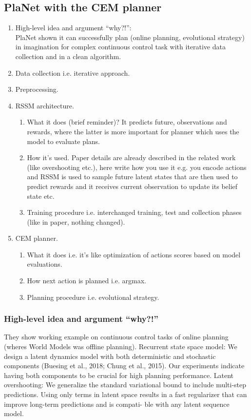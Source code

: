 \subsection{PlaNet with the CEM planner}

\begin{enumerate}
\item High-level idea and argument ``why?!'':\\
  PlaNet shown it can successfully plan (online planning, evolutional strategy) in imagination for complex continuous control task with iterative data collection and in a clean algorithm.
\item Data collection i.e. iterative approach.
\item Preprocessing.
\item RSSM architecture.\\ 
  \begin{enumerate}
  \item What it does (brief reminder)? It predicts future, observations and rewards, where the latter is more important for planner which uses the model to evaluate plans. 
  \item How it's used. Paper details are already described in the related work (like overshooting etc.), here write how you use it e.g. you encode actions and RSSM is used to sample future latent states that are then used to predict rewards and it receives current observation to update its belief state etc.
  \item Training procedure i.e. interchanged training, test and collection phases (like in paper, nothing changed).
  \end{enumerate}
\item CEM planner.
  \begin{enumerate}
  \item What it does i.e. it's like optimization of actions scores based on model evaluations.
  \item How next action is planned i.e. argmax.
  \item Planning procedure i.e. evolutional strategy.
  \end{enumerate}
\end{enumerate}

\subsubsection{High-level idea and argument ``why?!''}
They show working example on continuous control tasks of online planning (wheres World Models was offline planning). 
Recurrent state space model: We design a latent dynamics model with both deterministic and stochastic components (Buesing et al., 2018; Chung et al., 2015). Our experiments indicate having both components to be crucial for high planning performance.
Latent overshooting: We generalize the standard variational bound to include multi-step predictions. Using only terms in latent space results in a fast regularizer that can improve long-term predictions and is compati- ble with any latent sequence model.


